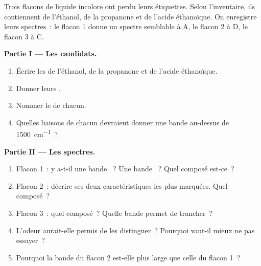 \begin{problem}
\label{pb:g11:infrared:1}
Trois flacons de liquide incolore ont perdu leurs étiquettes. Selon
l'inventaire, ils contiennent de l'éthanol, de la propanone et de
l'acide éthanoïque. On enregistre leurs spectres~: le flacon 1 donne un
spectre semblable à A, le flacon 2 à D, le flacon 3 à C.

\medskip
\noindent\textbf{Partie I --- Les candidats.}
\begin{enumerate}
  \item Écrire les  de l'éthanol, de la
        propanone et de l'acide éthanoïque.
  \item Donner leurs .
  \item Nommer le  de chacun.
  \item Quelles liaisons de chacun devraient donner une bande au-dessus
        de \qty{1500}{cm^{-1}}~?
\end{enumerate}

\medskip
\noindent\textbf{Partie II --- Les spectres.}
\begin{enumerate}[resume]
  \item Flacon 1~: y a-t-il une bande ~? Une bande ~?
        Quel composé est-ce~?
  \item Flacon 2~: décrire ses deux caractéristiques les plus marquées.
        Quel composé~?
  \item Flacon 3~: quel composé~? Quelle bande permet de trancher~?
  \item L'odeur aurait-elle permis de les distinguer~? Pourquoi vaut-il
        mieux ne pas essayer~?
  \item Pourquoi la bande  du flacon 2 est-elle plus large que
        celle du flacon 1~?
\end{enumerate}


\end{problem}
